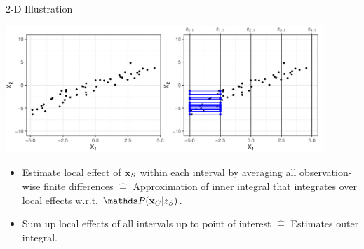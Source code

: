 \documentclass[11pt,compress,t,notes=noshow, aspectratio=169, xcolor=table]{beamer}
\begin{document}
\begin{frame}{2-D Illustration}
\centerline{\includegraphics[width=0.9\textwidth]{figure/ale_interval}}

 \begin{itemize}
  \item Estimate local effect of $\xv_S$ within each interval by averaging all observation-wise finite differences $\hat = $ Approximation of inner integral that integrates over local effects w.r.t. $\P(\xv_C | z_S)$. %
  \item Sum up local effects of all intervals up to point of interest $\hat = $ Estimates outer integral.
\end{itemize}

\end{frame}
%
%
%
%
%
%
%
%
%
%
\end{document}
